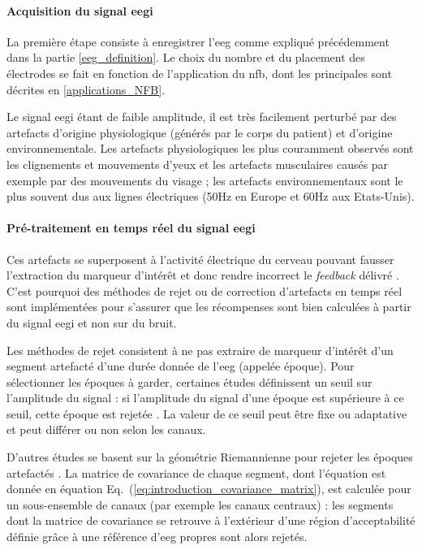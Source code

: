 \paragraph{Acquisition du signal \gls{eegi}}
La première étape consiste à enregistrer l'\gls{eeg} comme expliqué précédemment dans la partie \ref{eeg_definition}. Le choix
du nombre et du placement des électrodes se fait en fonction de l'application du \gls{nfb}, dont les principales sont décrites en
\ref{applications_NFB}. 

Le signal \gls{eegi} étant de faible amplitude, il est très facilement perturbé par des artefacts d'origine physiologique (générés par le
corps du patient) et d'origine environnementale. Les artefacts physiologiques les plus couramment observés sont les clignements et mouvements
d'yeux \citep{Iwasaki2005} et les artefacts musculaires \citep{Goncharova2003} causés par exemple par des mouvements du visage ; les artefacts environnementaux sont le plus souvent 
dus aux lignes électriques (50Hz en Europe et 60Hz aux Etats-Unis). 

\paragraph{Pré-traitement en temps réel du signal \gls{eegi}}
Ces artefacts se superposent à l'activité électrique du cerveau pouvant fausser l'extraction du marqueur d'intérêt et donc rendre
incorrect le \textit{feedback} délivré \citep{Enriquez2017, Montgomery2001, Sherlin2011, Paluch2017}. C'est pourquoi des méthodes de rejet ou de correction d'artefacts en temps 
réel sont implémentées pour s'assurer que les récompenses sont bien calculées à partir du signal \gls{eegi} et non sur du bruit. 

Les méthodes de rejet consistent à ne pas extraire de marqueur d'intérêt d'un segment artefacté d'une durée donnée de l'\gls{eeg} (appelée époque). 
Pour sélectionner les époques à garder, certaines études définissent un seuil sur l'amplitude du signal : si l'amplitude du signal d'une époque est supérieure
à ce seuil, cette époque est rejetée \citep{Gevensleben2009, Heinrich2004}. La valeur de ce seuil peut être fixe ou adaptative et peut 
différer ou non selon les canaux. 

D'autres études se basent sur la géométrie Riemannienne pour rejeter les époques artefactés \citep{Barachant2013, Barthelemy2019, Bioulac2019}. 
La matrice de covariance de chaque segment, dont l'équation est donnée en équation Eq.~(\ref{eq:introduction_covariance_matrix}), est calculée pour un sous-ensemble de canaux (par exemple les canaux
centraux) : les segments dont la matrice de covariance se retrouve à l'extérieur d'une région d'acceptabilité définie grâce à une référence d'\gls{eeg} propres sont alors rejetés.

